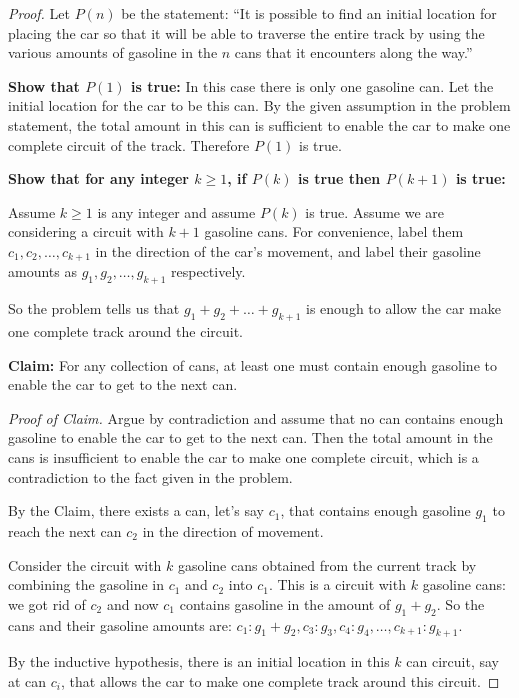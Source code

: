 \documentclass[14pt]{extarticle}
\begin{document}
\begin{proof}
Let $P(n)$ be the statement: ``It is possible to find an initial location for placing the car so that it will be able to traverse the entire track by using the various amounts of gasoline in the $n$ cans that it encounters along the way.''

{\bf Show that $P(1)$ is true:} In this case there is only one gasoline can. Let the initial location for the car to be this can. By the given assumption in the problem statement, the total amount in this can is sufficient to enable the car to make one complete circuit of the track. Therefore $P(1)$ is true.

{\bf Show that for any integer $k \geq 1$, if $P(k)$ is true then $P(k+1)$ is true:}

Assume $k \geq 1$ is any integer and assume $P(k)$ is true. Assume we are considering a circuit with $k+1$ gasoline cans. For convenience, label them $c_1, c_2, \ldots, c_{k+1}$ in the direction of the car's movement, and label their gasoline amounts as $g_1, g_2, \ldots, g_{k+1}$ respectively.

So the problem tells us that $g_1 + g_2 + \ldots + g_{k+1}$ is enough to allow the car make one complete track around the circuit.

{\bf Claim:} For any collection of cans, at least one must
contain enough gasoline to enable the car to get to the
next can.

{\it Proof of Claim.} Argue by contradiction and assume that no can contains enough gasoline to enable the car to get to the next can. Then the total amount in the cans is insufficient to enable the car to make one complete circuit, which is a contradiction to the fact given in the problem.

By the Claim, there exists a can, let's say $c_1$, that contains enough gasoline $g_1$ to reach the next can $c_2$ in the direction of movement.

Consider the circuit with $k$ gasoline cans obtained from the current track by combining the gasoline in $c_1$ and $c_2$ into $c_1$. This is a circuit with $k$ gasoline cans: we got rid of $c_2$ and now $c_1$ contains gasoline in the amount of $g_1 + g_2$. So the cans and their gasoline amounts are: $c_1: g_1 + g_2, c_3: g_3, c_4: g_4, \ldots, c_{k+1}: g_{k+1}$.

By the inductive hypothesis, there is an initial location in this $k$ can circuit, say at can $c_i$, that allows the car to make one complete track around this circuit.


\end{proof}
\end{document}
